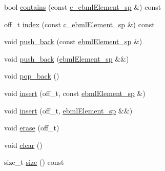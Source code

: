 \begin{DoxyCompactItemize}
\item 
bool \mbox{\hyperlink{classebml_1_1ebmlList_abab676e25a152cba3818e54d32cbfe35}{contains}} (const \mbox{\hyperlink{namespaceebml_a2deef4e8071531b32e3533f1bf978917}{c\+\_\+ebml\+Element\+\_\+sp}} \&) const
\item 
off\+\_\+t \mbox{\hyperlink{classebml_1_1ebmlList_a2f680a149168b81adfb6e85b7af8e272}{index}} (const \mbox{\hyperlink{namespaceebml_a2deef4e8071531b32e3533f1bf978917}{c\+\_\+ebml\+Element\+\_\+sp}} \&) const
\item 
void \mbox{\hyperlink{classebml_1_1ebmlList_ab13093132d1a49a67837fd51e6abc8af}{push\+\_\+back}} (const \mbox{\hyperlink{namespaceebml_adad533b7705a16bb360fe56380c5e7be}{ebml\+Element\+\_\+sp}} \&)
\item 
void \mbox{\hyperlink{classebml_1_1ebmlList_aa96dd50adeed937177a8addc38daf3f0}{push\+\_\+back}} (\mbox{\hyperlink{namespaceebml_adad533b7705a16bb360fe56380c5e7be}{ebml\+Element\+\_\+sp}} \&\&)
\item 
void \mbox{\hyperlink{classebml_1_1ebmlList_a02685f24e74011cb4798467e7041c472}{pop\+\_\+back}} ()
\item 
void \mbox{\hyperlink{classebml_1_1ebmlList_abc0424061c7edb3ecdfd5169f7de7288}{insert}} (off\+\_\+t, const \mbox{\hyperlink{namespaceebml_adad533b7705a16bb360fe56380c5e7be}{ebml\+Element\+\_\+sp}} \&)
\item 
void \mbox{\hyperlink{classebml_1_1ebmlList_a7dc291c779b8e3e389a68caf8266ebf3}{insert}} (off\+\_\+t, \mbox{\hyperlink{namespaceebml_adad533b7705a16bb360fe56380c5e7be}{ebml\+Element\+\_\+sp}} \&\&)
\item 
void \mbox{\hyperlink{classebml_1_1ebmlList_a5b2db67357ddbee4801414fed4fb1640}{erase}} (off\+\_\+t)
\item 
void \mbox{\hyperlink{classebml_1_1ebmlList_a757aaf37e69f54397c74fab476c0cdc1}{clear}} ()
\item 
size\+\_\+t \mbox{\hyperlink{classebml_1_1ebmlList_a9537fed381f80c9d06fdd2ccb08a42b2}{size}} () const
\end{DoxyCompactItemize}
